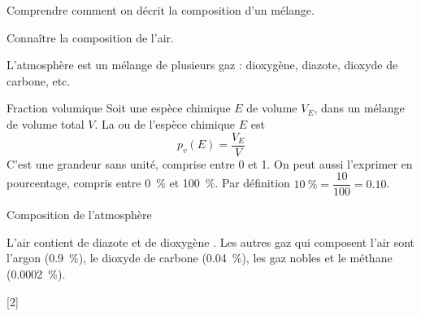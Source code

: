 \teteSndCorp

\vspace*{-36pt}


\begin{objectifs}
  \item Comprendre comment on décrit la composition d'un mélange.
  \item Connaître la composition de l'air.
\end{objectifs}

\begin{contexte}
  L'atmosphère est un mélange de plusieurs gaz : dioxygène, diazote, dioxyde de carbone, etc.
  
\end{contexte}


\begin{doc}{Fraction volumique}
  Soit une espèce chimique $E$ de volume $V_E$, dans un mélange de volume total $V$.
  La  ou  de l'espèce chimique $E$ est
  \begin{equation*}
    p_{v}(E) = \frac{V_E}{V}
  \end{equation*}
  C'est une grandeur sans unité, comprise entre 0 et 1.
  On peut aussi l'exprimer en pourcentage, compris entre \qty{0}{\percent} et \qty{100}{\percent}.
  Par définition $\qty{10}{\percent} = \dfrac{10}{100} = \num{0,10}$.
\end{doc}

\begin{doc}{Composition de l'atmosphère}
  \begin{importants}
    L’air contient  de diazote \diazote et  de dioxygène \dioxygene.
    Les autres gaz qui composent l’air sont l’argon  (\qty{0,9}{\percent}),
    le dioxyde de carbone \dioxydeDeCarbone (\qty{0,04}{\percent}),
    les gaz nobles et le méthane \methane (\qty{0,0002}{\percent}).
  \end{importants}
\end{doc}


[2]

